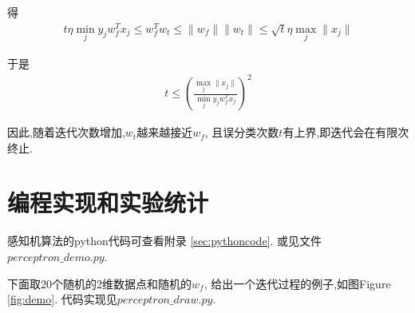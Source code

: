\documentclass[a4paper,12pt]{article}
\begin{document}
        得
        \begin{eqnarray}
            t \eta \min_j y_j w_f^T x_j \le w_f^T w_t \le \|w_f\| \|w_t\| \le \sqrt{t} \eta \max_j \| x_j \|
		\end{eqnarray}
		
        于是
        \begin{eqnarray}
            t \le \left( \frac{\max_j \| x_j \|}{\min_j y_j w_f^T x_j} \right)^2 \label{eqn:maxt}
		\end{eqnarray}

        因此,随着迭代次数增加,$w_t$越来越接近$w_f$,
        且误分类次数$t$有上界,即迭代会在有限次终止.

    \section{编程实现和实验统计}
		
		感知机算法的python代码可查看附录 \ref{sec:pythoncode}.
		或见文件$perceptron\_demo.py$.

		下面取20个随机的2维数据点和随机的$w_f$,
		给出一个迭代过程的例子,如图Figure \ref{fig:demo}.
		代码实现见$perceptron\_draw.py$.
\end{document}
